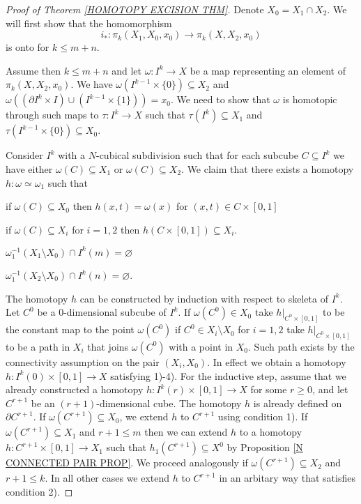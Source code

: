\begin{proof}[Proof of Theorem \ref{HOMOTOPY  EXCISION THM}]
Denote $X_{0} = X_{1}\cap X_{2}$. We will first show that the homomorphism 
\[
i_{\ast}\colon \pi_{k}(X_{1}, X_{0}, x_{0}) \to \pi_{k}(X, X_{2}, x_{0})
\]
is onto for $k\leq m+n$. 

Assume then $k \leq m+n$ and let $\omega \colon I^{k}\to X$ be a map 
representing an element of $\pi_{k}(X, X_{2}, x_{0})$. We have 
$\omega(I^{k-1}\times \{0\})\subseteq X_{2}$ and 
$\omega ((\partial I^{k} \times I) \cup (I^{k-1}\times \{1\})) = x_{0}$. 
We need to show that $\omega$ is homotopic through such maps to 
$\tau \colon I^{k}\to X$ such that $\tau(I^{k}) \subseteq X_{1}$ and 
$\tau(I^{k-1}\times \{0\})\subseteq X_{0}$.

Consider $I^{k}$ with a $N$-cubical subdivision such that for each subcube 
$C\subseteq I^{k}$ we have either 
$\omega(C) \subseteq X_{1}$ or $\omega(C) \subseteq X_{2}$.
We claim that there exists a homotopy $h\colon \omega \simeq \omega_{1}$
such that 
\benu

\item if $\omega(C) \subseteq X_{0}$ then $h(x, t) = \omega(x)$ 
for  $(x, t)\in C \times [0, 1]$
\item if $\omega(C) \subseteq X_{i}$ for $i=1, 2$ then 
$h(C\times [0, 1]) \subseteq X_{i}$. 
\item $\omega^{-1}_{1}(X_{1}\setminus X_{0}) \cap I^{k}(m) = \varnothing$
\item $\omega^{-1}_{1}(X_{2}\setminus X_{0}) \cap I^{k}(n) = \varnothing$. 
\eenu

The homotopy $h$ can be constructed by induction with respect to skeleta 
of $I^{k}$. Let $C^{0}$ be a $0$-dimensional subcube of $I^{k}$. If $\omega(C^{0})\in X_{0}$
take $h|_{C^{0}\times [0, 1]}$ to be the constant map to the point $\omega(C^{0})$  
if $C^{0}\in X_{i}\setminus X_{0}$ for $i=1, 2$ take $h|_{C^{0}\times [0, 1]}$
to be a path in $X_{i}$ that joins $\omega(C^{0})$ with a point in $X_{0}$. 
Such path exists by the connectivity assumption on the pair $(X_{i}, X_{0})$. 
In effect we obtain a homotopy $h\colon I^{k}(0)\times [0, 1]\to X$ 
satisfying 1)-4). For the inductive step, assume  that we already constructed 
a homotopy $h\colon I^{k}(r)\times [0, 1]\to X$ for some $r\geq 0$, and let $C^{r+1}$
be an $(r+1)$-dimensional cube. The homotopy $h$ is already defined on $\partial C^{r+1}$. 
If $\omega(C^{r+1}) \subseteq X_{0}$, we extend $h$ to $C^{r+1}$ using 
condition 1). If $\omega(C^{r+1})\subseteq X_{1}$ and $r+1 \leq m$ then 
we can extend $h$ to a homotopy  $h\colon C^{r+1}\times [0, 1] \to X_{1}$ 
such that $h_{1}(C^{r+1}) \subseteq X^{0}$ by Proposition \ref{N CONNECTED PAIR PROP}.  
We proceed analogously if $\omega(C^{r+1})\subseteq X_{2}$ and $r+1 \leq k$. In all other 
cases we extend $h$ to $C^{r+1}$ in an arbitary way that satisfies condition 2). 


\end{proof}
